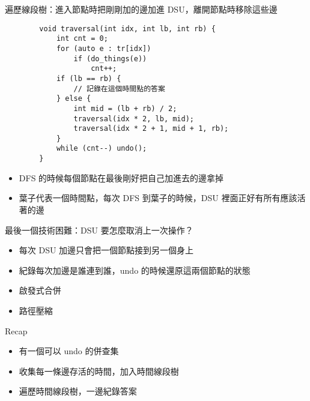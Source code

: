\begin{frame}[fragile]{\ebtitle}
    遍歷線段樹：進入節點時把剛剛加的邊加進 DSU，離開節點時移除這些邊
    \begin{verbatim}
        void traversal(int idx, int lb, int rb) {
            int cnt = 0;
            for (auto e : tr[idx])
                if (do_things(e))
                    cnt++;
            if (lb == rb) {
                // 記錄在這個時間點的答案
            } else {
                int mid = (lb + rb) / 2;
                traversal(idx * 2, lb, mid);
                traversal(idx * 2 + 1, mid + 1, rb); 
            }
            while (cnt--) undo();
        }
    \end{verbatim}
\end{frame}


\begin{frame}{\ebtitle}
    \begin{itemize}
        \item DFS 的時候每個節點在最後剛好把自己加進去的邊拿掉
        \item 葉子代表一個時間點，每次 DFS 到葉子的時候，DSU 裡面正好有所有應該活著的邊
    \end{itemize}
\end{frame}

\begin{frame}{\ebtitle}
    最後一個技術困難：DSU 要怎麼取消上一次操作？

    \begin{itemize}
        \item 每次 DSU 加邊只會把一個節點接到另一個身上
        \item 紀錄每次加邊是誰連到誰，undo 的時候還原這兩個節點的狀態
        \item 啟發式合併 
        \item 路徑壓縮 
    \end{itemize}
\end{frame}

\begin{frame}{\ebtitle}
    Recap
    
    \begin{itemize}
        \item 有一個可以 undo 的併查集
        \item 收集每一條邊存活的時間，加入時間線段樹
        \item 遍歷時間線段樹，一邊紀錄答案
    \end{itemize}
\end{frame}

